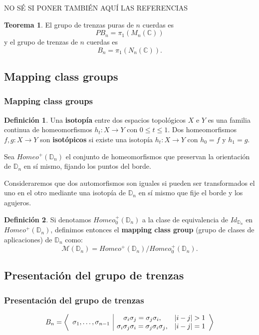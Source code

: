 \documentclass{beamer}
\theoremstyle{definition}
\newtheorem{teorema}{Teorema}
\newtheorem{defi}{Definición}
\newcommand{\C}{\mathbb{C}}
\newcommand{\D}{\mathbb{D}}
\begin{document}
\begin{frame}
NO SÉ SI PONER TAMBIÉN AQUÍ LAS REFERENCIAS 
\begin{teorema}
El grupo de trenzas puras de $n$ cuerdas es
$$PB_n=\pi_1(M_n(\C))$$
y el grupo de trenzas de $n$ cuerdas es
$$B_n=\pi_1(N_n(\C)).$$
\end{teorema}
\end{frame}

\subsection{Mapping class groups}

\begin{frame}
\frametitle{Mapping class groups}
\begin{defi}
Una \textbf{isotopía} entre dos espacios topológicos $X$ e $Y$ es una familia continua de homeomorfismos $h_t:X\to Y$ con $0\leq t\leq 1$. Dos homeomorfismos $f,g:X\to Y$ son \textbf{isotópicos} si existe una isotopía $h_t:X\to Y$ con $h_0=f$ y $h_1=g$. 
\end{defi}
Sea $Homeo^+(\D_n)$ el conjunto de homeomorfismos que preservan la orientación de $\D_n$ en sí mismo, fijando los puntos del borde. 
\end{frame}


\begin{frame}
Consideraremos que dos automorfismos son iguales si pueden ser transformados el uno en el otro mediante una isotopía de $\D_n$ en sí mismo que fije el borde y los agujeros.
\begin{defi} Si denotamos $Homeo^+_0(\D_n)$ a la clase de equivalencia de $Id_{\D_n}$ en $Homeo^+(\D_n)$, definimos entonces el \textbf{mapping class group} (grupo de clases de aplicaciones) de $\D_n$ como:
$$\mathcal{M}(\D_n)=Homeo^+(\D_n)/Homeo^+_0(\D_n).$$
\end{defi}
\end{frame}

\subsection{Presentación del grupo de trenzas}



\begin{frame}
\frametitle{Presentación del grupo de trenzas}
\[
B_n=\left\langle\begin{array}{c| c c}
\multirow{2}{*}{$\sigma_1,\dots,\sigma_{n-1}$} & \sigma_i\sigma_j=\sigma_j\sigma_i, & |i-j|>1\\
& \sigma_i\sigma_j\sigma_i=\sigma_j\sigma_i\sigma_j, & |i-j|=1
\end{array}\right\rangle
\]
\end{frame}
\end{document}
